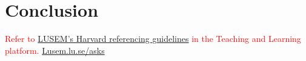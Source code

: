 \documentclass[12pt,twoside]{report}
\newcommand{\mcite}[1]{\textcolor{mycolor}{\citeauthor{#1} (\citeyear{#1})}}
\newcommand{\hcite}[1]{(\textcolor{mycolor}{\citeauthor{#1}, \citeyear{#1}})}
\begin{document}
    \chapter{Conclusion}
    
    
    
    
    \vspace{2.0cm}
    \textcolor{red}{Refer to \href{http://libguides.lub.lu.se/plagiarism}{LUSEM’s Harvard referencing guidelines} in the Teaching and Learning platform. \url{Lusem.lu.se/asks}}

%     
    
%     
\end{document}

